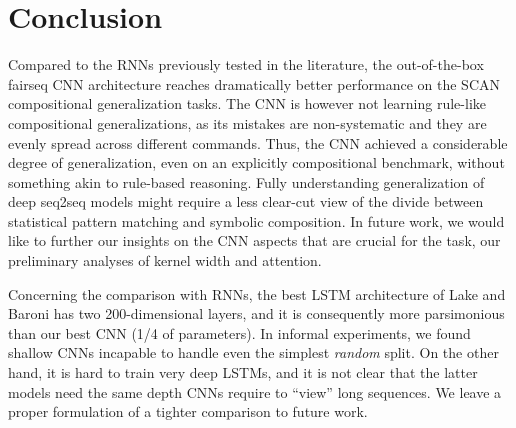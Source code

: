 \section{Conclusion}

Compared to the RNNs previously tested in the
literature, the out-of-the-box fairseq CNN architecture reaches
dramatically better performance on the SCAN compositional
generalization tasks. The CNN
is however not  learning rule-like compositional generalizations, as its
mistakes are non-systematic and they are evenly spread across different
commands. Thus, the CNN  achieved a considerable
degree of generalization, even on an explicitly compositional
benchmark, without something akin to rule-based reasoning. Fully
understanding generalization of deep seq2seq models might require a less
clear-cut view of the divide between statistical pattern matching and
symbolic composition. In future work, we would like to further our insights on the
CNN aspects that are crucial for the task,  our preliminary
analyses of kernel width and attention.

Concerning the comparison with RNNs, the best LSTM architecture of
Lake and Baroni has two 200-dimensional layers, and it is consequently
more parsimonious than our best CNN (1/4 of parameters). In informal
experiments, we found shallow CNNs incapable to handle even the
simplest \emph{random} split. On the other hand, it is hard to train
very deep LSTMs, and it is not clear that the latter models need the
same depth CNNs require to ``view'' long sequences. We
leave a proper formulation of a tighter comparison to future work.
